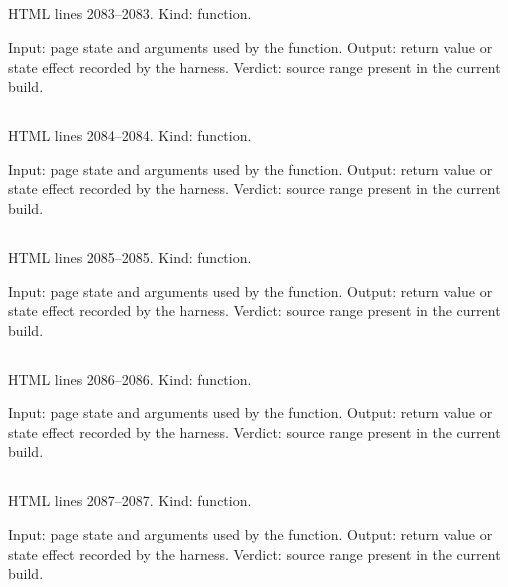 \subsection*{\texttt{}}
\label{vf_25_option}
HTML lines 2083--2083. Kind: function.

Input: page state and arguments used by the function.
Output: return value or state effect recorded by the harness.
Verdict: source range present in the current build.

\subsection*{\texttt{}}
\label{vf_26_num}
HTML lines 2084--2084. Kind: function.

Input: page state and arguments used by the function.
Output: return value or state effect recorded by the harness.
Verdict: source range present in the current build.

\subsection*{\texttt{}}
\label{vf_27_safeRe}
HTML lines 2085--2085. Kind: function.

Input: page state and arguments used by the function.
Output: return value or state effect recorded by the harness.
Verdict: source range present in the current build.

\subsection*{\texttt{}}
\label{vf_28_uniq}
HTML lines 2086--2086. Kind: function.

Input: page state and arguments used by the function.
Output: return value or state effect recorded by the harness.
Verdict: source range present in the current build.

\subsection*{\texttt{}}
\label{vf_29_byKey}
HTML lines 2087--2087. Kind: function.

Input: page state and arguments used by the function.
Output: return value or state effect recorded by the harness.
Verdict: source range present in the current build.

